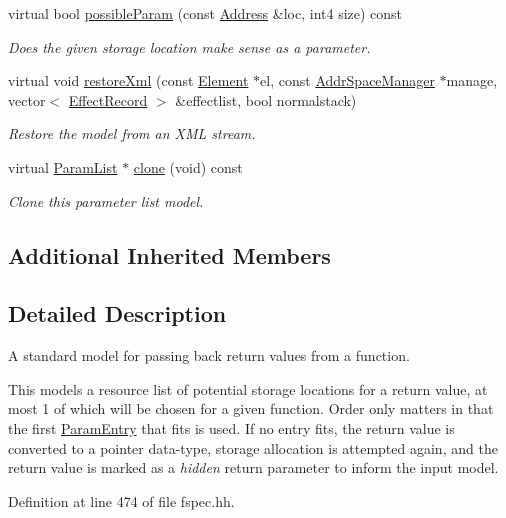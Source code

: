 \begin{DoxyCompactItemize}
virtual bool \mbox{\hyperlink{class_param_list_standard_out_a9c8b1c882536296945ff816d9e3f3600}{possible\+Param}} (const \mbox{\hyperlink{class_address}{Address}} \&loc, int4 size) const
\begin{DoxyCompactList}\small\item\em Does the given storage location make sense as a parameter. \end{DoxyCompactList}\item 
virtual void \mbox{\hyperlink{class_param_list_standard_out_a6ca5a4b571dad6ad5378afda6ac84e0c}{restore\+Xml}} (const \mbox{\hyperlink{class_element}{Element}} $\ast$el, const \mbox{\hyperlink{class_addr_space_manager}{Addr\+Space\+Manager}} $\ast$manage, vector$<$ \mbox{\hyperlink{class_effect_record}{Effect\+Record}} $>$ \&effectlist, bool normalstack)
\begin{DoxyCompactList}\small\item\em Restore the model from an X\+ML stream. \end{DoxyCompactList}\item 
virtual \mbox{\hyperlink{class_param_list}{Param\+List}} $\ast$ \mbox{\hyperlink{class_param_list_standard_out_acec6ec68623556e54bdf42a61c20ea0e}{clone}} (void) const
\begin{DoxyCompactList}\small\item\em Clone this parameter list model. \end{DoxyCompactList}\end{DoxyCompactItemize}
\subsection*{Additional Inherited Members}


\subsection{Detailed Description}
A standard model for passing back return values from a function. 

This models a resource list of potential storage locations for a return value, at most 1 of which will be chosen for a given function. Order only matters in that the first \mbox{\hyperlink{class_param_entry}{Param\+Entry}} that fits is used. If no entry fits, the return value is converted to a pointer data-\/type, storage allocation is attempted again, and the return value is marked as a {\itshape hidden} return parameter to inform the input model. 

Definition at line 474 of file fspec.\+hh.



